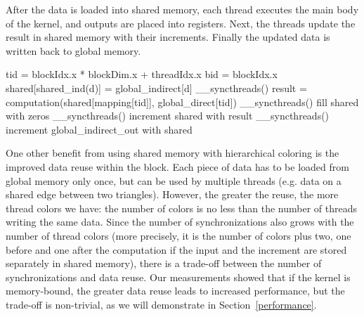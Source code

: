 After the data is loaded into shared memory, each thread executes the main body 
of the kernel, and outputs are placed into registers.  Next, the threads update 
the result in shared memory with their increments. Finally the updated data is 
written back to global memory.

\begin{algorithm}
  \begin{algorithmic}
    \State tid = blockIdx.x * blockDim.x + threadIdx.x
    \State bid = blockIdx.x
      \State shared[shared\_ind(d)] = global\_indirect[d]
    \EndFor
    \State \_\_syncthreads()
    \State result = computation(shared[mapping[tid]], global\_direct[tid])
    \State \_\_syncthreads()
    \State fill shared with zeros
    \State \_\_syncthreads()
        \State increment shared with result
      \EndIf
      \State \_\_syncthreads()
    \EndFor
      \State increment global\_indirect\_out with shared
    \EndFor
  \end{algorithmic}
  \caption{Algorithm to use the shared memory to preload indirect data accessed
  within a thread block. \lstinline!global_indirect! holds the data indirectly
  read, \lstinline!global_indirect_out! holds the result of the iteration.}
  \label{code:shared}
\end{algorithm}

One other benefit from using shared memory with hierarchical coloring is the 
improved data reuse within the block. Each piece of data has to be loaded 
from global memory only once, but can be used by multiple threads (e.g. data on 
a shared edge between two triangles). However, the greater the reuse, the more 
thread colors we have: the number of colors is no less than the number of 
threads writing the same data. Since the number of synchronizations also grows 
with the number of thread colors (more precisely, it is the number of colors 
plus two, one before and one after the computation if the input and the 
increment are stored separately in shared memory), there is a trade-off between 
the number of synchronizations and data reuse. Our measurements showed that if 
the kernel is memory-bound, the greater data reuse leads to increased 
performance, but the trade-off is non-trivial, as we will demonstrate in 
Section~\ref{performance}.

